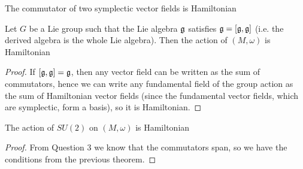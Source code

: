 \documentclass{article}
\begin{document}
\begin{corollary}
The commutator of two symplectic vector fields is Hamiltonian
\end{corollary}

\begin{theorem}
Let $G$ be a Lie group such that the Lie algebra $\mf{g}$ satisfies $\mf{g} = \comm[\mf{g}]{\mf{g}}$ (i.e. the derived algebra is the whole Lie algebra). Then the action of $(M,\omega)$ is Hamiltonian
\end{theorem}
\begin{proof}
If $\comm[\mf{g}]{\mf{g}} = \mf{g}$, then any vector field can be written as the sum of commutators, hence we can write any fundamental field of the group action as the sum of Hamiltonian vector fields (since the fundamental vector fields, which are symplectic, form a basis), so it is Hamiltonian. 
\end{proof}

\begin{corollary}
The action of $SU(2)$ on $(M,\omega)$ is Hamiltonian
\end{corollary}
\begin{proof}
From Question 3 we know that the commutators span, so we have the conditions from the previous theorem. 
\end{proof}

\end{document}
